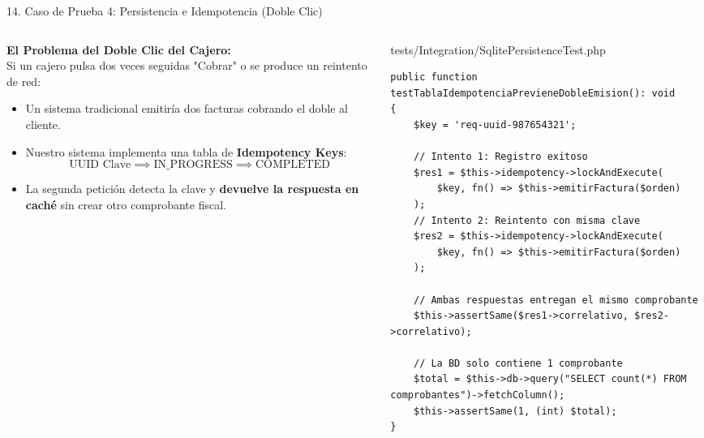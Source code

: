 \documentclass[aspectratio=169,10pt]{beamer}
\begin{document}
\begin{frame}[fragile]{14. Caso de Prueba 4: Persistencia e Idempotencia (Doble Clic)}
\begin{columns}
\begin{column}{0.48\textwidth}
    \fontsize{6.8pt}{8.2pt}\selectfont\color{textwhite}
    \textbf{El Problema del Doble Clic del Cajero:}\\[0.1cm]
    Si un cajero pulsa dos veces seguidas "Cobrar" o se produce un reintento de red:
    \vspace{0.08cm}
    \begin{itemize}
        \item Un sistema tradicional emitiría dos facturas cobrando el doble al cliente.
        \item Nuestro sistema implementa una tabla de \textbf{Idempotency Keys}:
        $$\text{UUID Clave} \implies \text{IN\_PROGRESS} \implies \text{COMPLETED}$$
        \item La segunda petición detecta la clave y \textbf{devuelve la respuesta en caché} sin crear otro comprobante fiscal.
    \end{itemize}
\end{column}
\begin{column}{0.52\textwidth}
    \begin{codebox}{tests/Integration/SqlitePersistenceTest.php}
\begin{lstlisting}
public function testTablaIdempotenciaPrevieneDobleEmision(): void 
{
    $key = 'req-uuid-987654321';
    
    // Intento 1: Registro exitoso
    $res1 = $this->idempotency->lockAndExecute(
        $key, fn() => $this->emitirFactura($orden)
    );
    // Intento 2: Reintento con misma clave
    $res2 = $this->idempotency->lockAndExecute(
        $key, fn() => $this->emitirFactura($orden)
    );

    // Ambas respuestas entregan el mismo comprobante
    $this->assertSame($res1->correlativo, $res2->correlativo);
    
    // La BD solo contiene 1 comprobante
    $total = $this->db->query("SELECT count(*) FROM comprobantes")->fetchColumn();
    $this->assertSame(1, (int) $total);
}
\end{lstlisting}
    \end{codebox}
\end{column}
\end{columns}
\end{frame}
\end{document}
